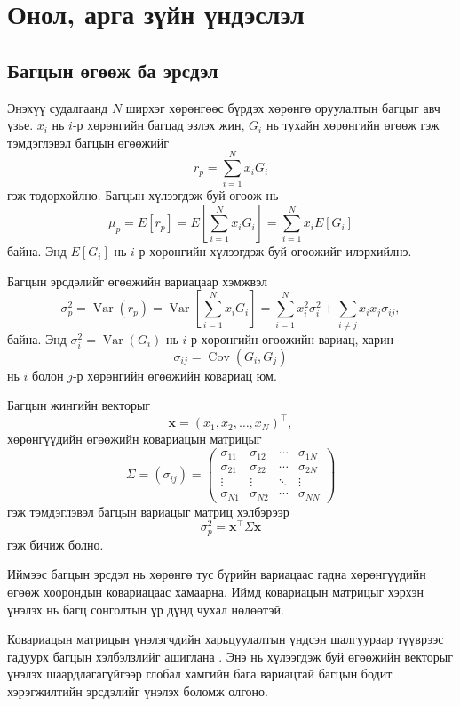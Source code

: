 \section{Онол, арга зүйн үндэслэл}

\subsection{Багцын өгөөж ба эрсдэл}


Энэхүү судалгаанд $N$ ширхэг хөрөнгөөс бүрдэх хөрөнгө оруулалтын багцыг авч үзье. $x_i$ нь $i$-р хөрөнгийн багцад эзлэх жин, $G_i$ нь тухайн хөрөнгийн өгөөж гэж тэмдэглэвэл багцын өгөөжийг
\[
r_p
=
\sum_{i=1}^{N}x_iG_i
\]
гэж тодорхойлно. Багцын хүлээгдэж буй өгөөж нь
\[
\mu_p
=
E[r_p]
=
E\left[
\sum_{i=1}^{N}x_iG_i
\right]
=
\sum_{i=1}^{N}x_iE[G_i]
\]
байна. Энд $E[G_i]$ нь $i$-р хөрөнгийн хүлээгдэж буй өгөөжийг илэрхийлнэ.

Багцын эрсдэлийг өгөөжийн вариацаар хэмжвэл
\[
\sigma_p^2
=
\operatorname{Var}(r_p)
=
\operatorname{Var}
\left[
\sum_{i=1}^{N}x_iG_i
\right]
=
\sum_{i=1}^{N}x_i^2\sigma_i^2
+
\sum_{i\neq j}x_ix_j\sigma_{ij},
\]
байна. Энд $\sigma_i^2=\operatorname{Var}(G_i)$ нь $i$-р
хөрөнгийн өгөөжийн вариац, харин
\[
\sigma_{ij}
=
\operatorname{Cov}(G_i,G_j)
\]
нь $i$ болон $j$-р хөрөнгийн өгөөжийн ковариац юм.

Багцын жингийн векторыг
\[
\mathbf{x}
=
(x_1,x_2,\ldots,x_N)^{\top},
\]
хөрөнгүүдийн өгөөжийн ковариацын матрицыг
\[
\Sigma
=
(\sigma_{ij})
=
\begin{pmatrix}
	\sigma_{11} & \sigma_{12} & \cdots & \sigma_{1N}\\
	\sigma_{21} & \sigma_{22} & \cdots & \sigma_{2N}\\
	\vdots      & \vdots      & \ddots & \vdots\\
	\sigma_{N1} & \sigma_{N2} & \cdots & \sigma_{NN}
\end{pmatrix}
\]
гэж тэмдэглэвэл багцын вариацыг матриц хэлбэрээр
\[
\sigma_p^2
=
\mathbf{x}^{\top}\Sigma\mathbf{x}
\]
гэж бичиж болно.

Иймээс багцын эрсдэл нь хөрөнгө тус бүрийн вариацаас гадна хөрөнгүүдийн өгөөж хоорондын ковариацаас хамаарна. Иймд ковариацын матрицыг хэрхэн үнэлэх нь багц сонголтын үр дүнд чухал нөлөөтэй.

Ковариацын матрицын үнэлэгчдийн харьцуулалтын үндсэн шалгуураар
түүврээс гадуурх багцын хэлбэлзлийг ашиглана
\citep{ledoitwolf2022,DeNardKostovic2026}.
Энэ нь хүлээгдэж буй өгөөжийн векторыг үнэлэх шаардлагагүйгээр
глобал хамгийн бага вариацтай багцын бодит хэрэгжилтийн
эрсдэлийг үнэлэх боломж олгоно.




